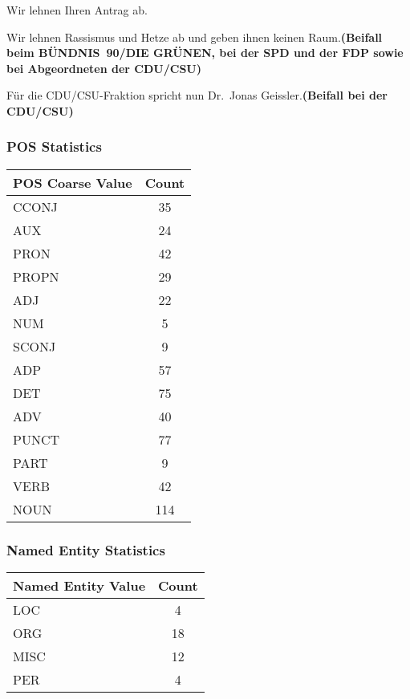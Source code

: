 \documentclass{article}
\begin{document}
\colorbox{CustomColor0}{\parbox{\linewidth}{Wir lehnen Ihren Antrag ab.}}

\colorbox{CustomColor10}{\parbox{\linewidth}{Wir lehnen Rassismus und Hetze ab und geben ihnen keinen Raum.\textbf{\textbf{(Beifall beim BÜNDNIS 90/DIE GRÜNEN, bei der SPD und der FDP sowie bei Abgeordneten der CDU/CSU)}}}}

\colorbox{CustomColor0}{\parbox{\linewidth}{Für die CDU/CSU-Fraktion spricht nun Dr. Jonas Geissler.\textbf{(Beifall bei der CDU/CSU)}}}

\subsubsection*{POS Statistics}
\begin{tabular}{|l|c|}
\hline
\textbf{POS Coarse Value} & \textbf{Count} \\
\hline
CCONJ & 35 \\
\hline
AUX & 24 \\
\hline
PRON & 42 \\
\hline
PROPN & 29 \\
\hline
ADJ & 22 \\
\hline
NUM & 5 \\
\hline
SCONJ & 9 \\
\hline
ADP & 57 \\
\hline
DET & 75 \\
\hline
ADV & 40 \\
\hline
PUNCT & 77 \\
\hline
PART & 9 \\
\hline
VERB & 42 \\
\hline
NOUN & 114 \\
\hline
\end{tabular}
\subsubsection*{Named Entity Statistics}
\begin{tabular}{|l|c|}
\hline
\textbf{Named Entity Value} & \textbf{Count} \\
\hline
LOC & 4 \\
\hline
ORG & 18 \\
\hline
MISC & 12 \\
\hline
PER & 4 \\
\hline
\end{tabular}
\end{document}

